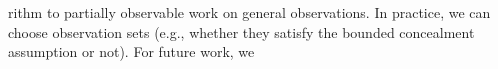 \documentclass[letterpaper]{article} %
\newcommand{\pre}{\textit{pre}}
\newcommand{\eff}{\textit{eff}}
\begin{document}



\section{}
  rithm \citep{juba2021safe} to partially observable    work on general observations. In practice,  we can choose  observation sets (e.g., whether they satisfy the bounded concealment assumption or not). For future work, we 



\clearpage

\end{document}
